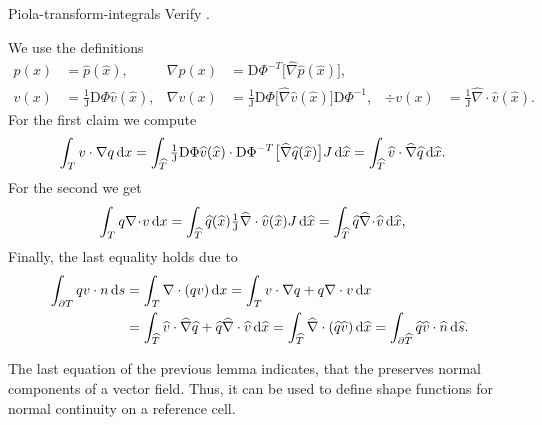 \begin{Problem}{Piola-transform-integrals}
  Verify .
\begin{solution}
  We use the definitions
  \begin{align*}
    p(x) &= \widehat p(\widehat x),&
    \nabla p(x) &= \mathrm D\Phi^{-T}
    \bigl[\widehat\nabla\widehat p(\widehat x)\bigr], \\
    v(x) &= \tfrac1{\mathrm J} \mathrm D\Phi \widehat v(\widehat x), &
    \nabla v(x) &= \tfrac1{\mathrm J} \mathrm D\Phi
    \bigl[\widehat\nabla \widehat v(\widehat x)\bigr] \mathrm D\Phi^{-1}, &
    \div v(x) &= \tfrac1{\mathrm J} \widehat\nabla \cdot
    \widehat v(\widehat x).
  \end{align*}
For the first claim we compute
  \begin{align*}
    \int_{T} v \cdot \nabla q \,\mathrm{d} x
    &= \int_{\widehat {T}}
       \tfrac1{\mathrm J} \mathrm D\Phi \widehat v(\widehat x) \cdot
       \mathrm D\Phi^{-T}\bigl[\widehat\nabla\widehat q(\widehat x)\bigr]
       J \,\mathrm{d} \widehat x
    = \int_{\widehat {T}} \widehat v \cdot \widehat \nabla \widehat q \,\mathrm{d} \widehat x.
  \end{align*}
  For the second we get
  \begin{align*}
    \int_{T} q \nabla\!\cdot\! v \,\mathrm{d} x
    &= \int_{\widehat {T}}
       \widehat q(\widehat x)
       \tfrac1{\mathrm J} \widehat\nabla \cdot \widehat v(\widehat x)
       J \,\mathrm{d} \widehat x
    = \int_{\widehat {T}} \widehat q \widehat \nabla\!\cdot\! \widehat v \,\mathrm{d} \widehat x,
  \end{align*}
  Finally, the last equality holds due to
  \begin{align*}
    \int_{\partial T} q v\cdot n \,\mathrm{d} s
    &= \int_{T} \nabla \cdot(q v) \,\mathrm{d} x
    = \int_{T} v\cdot \nabla q + q\nabla \cdot v \,\mathrm{d} x \\
    &= \int_{\widehat {T}} \widehat v\cdot \widehat \nabla \widehat q
                      + \widehat q \widehat \nabla \cdot \widehat v \,\mathrm{d} \widehat x
    = \int_{\widehat {T}}\widehat \nabla \cdot(\widehat q \widehat v) \,\mathrm{d} \widehat x
    = \int_{\partial\widehat {T}} \widehat q \widehat v\cdot\widehat {n} \,\mathrm{d} \widehat s.
  \end{align*}

\end{solution}
\end{Problem}

\begin{remark}
  The last equation of the previous lemma indicates, that the
   preserves normal components of a vector
  field. Thus, it can be used to define shape functions for normal
  continuity on a reference cell.
\end{remark}

